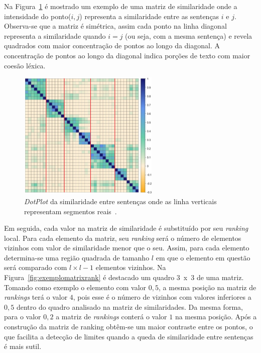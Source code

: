 
Na Figura~\ref{fig:matrix-similarity} é mostrado um exemplo de uma matriz de similaridade onde a intensidade do ponto($i,j$) representa a similaridade entre as sentenças $i$ e $j$. Observa-se que a matriz é simétrica, assim cada ponto na linha diagonal representa a similaridade quando $i = j$ (ou seja, com a mesma sentença) e revela quadrados com maior concentração de pontos ao longo da diagonal. A concentração de pontos ao longo da diagonal indica porções de texto com maior coesão léxica.


  \begin{figure}[!h]
	  \centering
	  \includegraphics[width=0.6\textwidth]{conteudo/capitulos/figs/similarity-matrix-l.png}

	  \caption{\textit{DotPlot} da similaridade entre sentenças onde as linha verticais representam segmentos reais~\cite{Eis2008}.}
	  \label{fig:matrix-similarity}
  \end{figure}




Em seguida, cada valor na matriz de similaridade é substituído por seu \textit{ranking} local. Para cada elemento da matriz, seu \textit{ranking} será o número de elementos vizinhos com valor de similaridade menor que o seu. Assim, para cada elemento determina-se uma região quadrada de tamanho $l$ em que o elemento em questão será comparado com $l \times l - 1$ elementos vizinhos.
% 
% 
Na Figura~\ref{fig:exemplomatrixrank} é destacado um quadro 3~x~3 de uma matriz. Tomando como exemplo o elemento com valor $0,5$, a mesma posição na matriz de \textit{rankings} terá o valor $4$, pois esse é o número de vizinhos com valores inferiores a $0,5$ dentro do quadro analisado na matriz de similaridades. Da mesma forma, 
para o valor $0,2$ a matriz de \textit{rankings} conterá o valor $1$ na mesma posição. Após a construção da matriz de ranking obtêm-se um maior contraste entre os pontos, o que facilita a detecção de limites quando a queda de similaridade entre sentenças é mais sutil.

